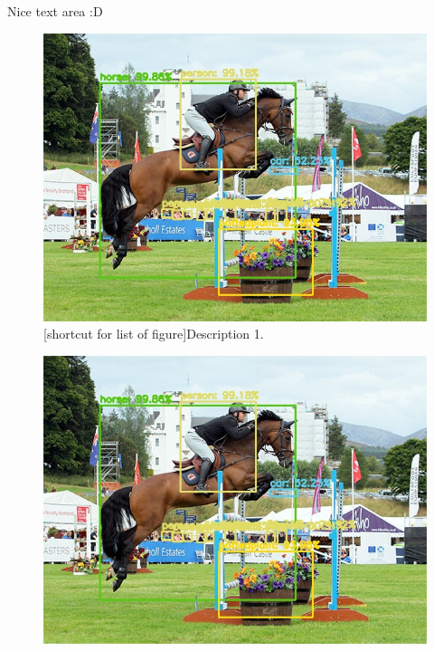 \begin{tcolorbox}	%
	\begin{center}
		Nice text area :D
	\end{center}
\end{tcolorbox}

\begin{figure}		%
	\centering
	\begin{minipage}{.49\textwidth}
		\centering
		\includegraphics[width=1\linewidth]{images/ex1_yolo}
		[shortcut for list of figure]{Description 1.}
		\label{fig:qqq}
	\end{minipage}
	\begin{minipage}{.49\textwidth}
		\centering
		\includegraphics[width=1\linewidth]{images/ex1_yolo}
		\captionsetup{margin=0.5cm}
		\label{fig:bbb}
	\end{minipage}
\end{figure}

